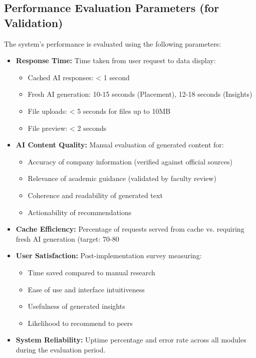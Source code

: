 \documentclass[12pt]{article}
\begin{document}
\subsection{Performance Evaluation Parameters (for Validation)}
The system's performance is evaluated using the following parameters:

\begin{itemize}
    \item \textbf{Response Time:} Time taken from user request to data display:
    \begin{itemize}
        \item Cached AI responses: < 1 second
        \item Fresh AI generation: 10-15 seconds (Placement), 12-18 seconds (Insights)
        \item File uploads: < 5 seconds for files up to 10MB
        \item File preview: < 2 seconds
    \end{itemize}
    
    \item \textbf{AI Content Quality:} Manual evaluation of generated content for:
    \begin{itemize}
        \item Accuracy of company information (verified against official sources)
        \item Relevance of academic guidance (validated by faculty review)
        \item Coherence and readability of generated text
        \item Actionability of recommendations
    \end{itemize}
    
    \item \textbf{Cache Efficiency:} Percentage of requests served from cache vs. requiring fresh AI generation (target: 70-80%
    
    \item \textbf{User Satisfaction:} Post-implementation survey measuring:
    \begin{itemize}
        \item Time saved compared to manual research
        \item Ease of use and interface intuitiveness
        \item Usefulness of generated insights
        \item Likelihood to recommend to peers
    \end{itemize}
    
    \item \textbf{System Reliability:} Uptime percentage and error rate across all modules during the evaluation period.
\end{itemize}
\end{document}
